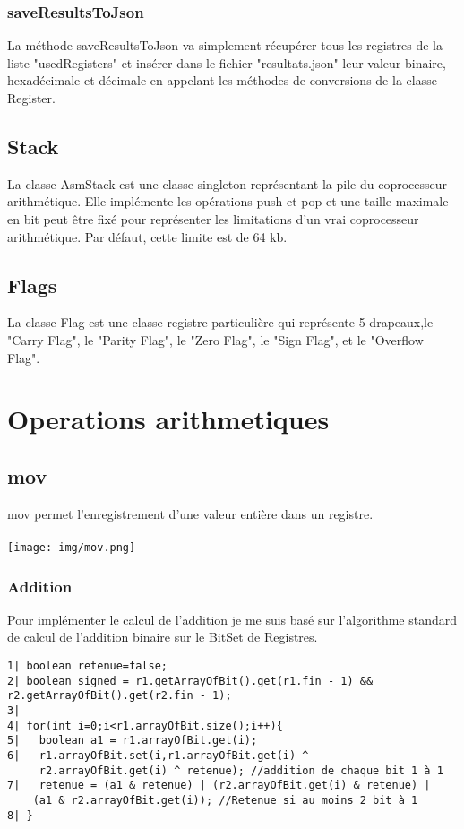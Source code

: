 \documentclass{article}
\begin{document}
\subsubsection{saveResultsToJson}

La méthode saveResultsToJson va simplement récupérer tous les registres de la liste "usedRegisters" et insérer dans le fichier "resultats.json"
leur valeur binaire, hexadécimale et décimale en appelant les méthodes de conversions de la classe Register.


\subsection{Stack}

La classe AsmStack est une classe singleton représentant la pile du coprocesseur arithmétique. Elle implémente les opérations push et pop et
une taille maximale en bit peut être fixé pour représenter les limitations d'un vrai coprocesseur arithmétique. Par défaut, cette limite est de 64 kb.

\subsection{Flags}

La classe Flag est une classe registre particulière qui représente 5 drapeaux,le "Carry Flag", le "Parity Flag", le "Zero Flag", le "Sign Flag", et le "Overflow Flag".

\section{Operations arithmetiques}
\subsection{mov}
mov permet l'enregistrement d'une valeur entière dans un registre.
\\
\\
\texttt{[image: img/mov.png]}

\newpage
\subsubsection{Addition}
Pour implémenter le calcul de l'addition je me suis basé sur l'algorithme standard de calcul de l'addition binaire sur le BitSet de Registres.

\begin{verbatim}
1| boolean retenue=false;
2| boolean signed = r1.getArrayOfBit().get(r1.fin - 1) && r2.getArrayOfBit().get(r2.fin - 1);
3|
4| for(int i=0;i<r1.arrayOfBit.size();i++){
5|   boolean a1 = r1.arrayOfBit.get(i);
6|   r1.arrayOfBit.set(i,r1.arrayOfBit.get(i) ^
     r2.arrayOfBit.get(i) ^ retenue); //addition de chaque bit 1 à 1
7|   retenue = (a1 & retenue) | (r2.arrayOfBit.get(i) & retenue) |
    (a1 & r2.arrayOfBit.get(i)); //Retenue si au moins 2 bit à 1
8| }
\end{verbatim}
\end{document}
